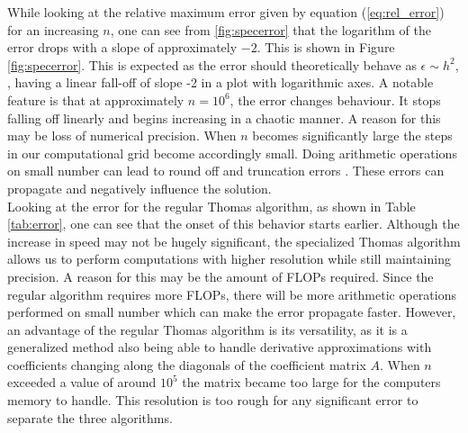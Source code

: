 \documentclass[twocolumn]{aastex62}
\begin{document}
While looking at the relative maximum error given by equation (\ref{eq:rel_error}) for an increasing $n$, one can see from \ref{fig:specerror} that the logarithm of the error drops with a slope of approximately $-2$. This is shown in Figure \ref{fig:specerror}. This is expected as the error should theoretically behave as $\epsilon\sim h^2$, , having a linear fall-off of slope -2 in a plot with logarithmic axes.  A notable feature is that at approximately $n=10^6$, the error changes behaviour. It stops falling off linearly and begins increasing in a chaotic manner. A reason for this may be loss of numerical precision. When $n$ becomes significantly large the steps in our computational grid become accordingly small. Doing arithmetic operations on small number can lead to round off and truncation errors \citep[ch 4.2]{Morken:2017}. These errors can propagate and negatively influence the solution.\\\indent
Looking at the error for the regular Thomas algorithm, as shown in Table \ref{tab:error}, one can see that the onset of this behavior starts earlier. Although the increase in speed may not be hugely significant, the specialized Thomas algorithm allows us to perform computations with higher resolution while still maintaining precision. A reason for this may be the amount of FLOPs required. Since the regular algorithm requires more FLOPs, there will be more arithmetic operations performed on small number which can make the error propagate faster. However, an advantage of the regular Thomas algorithm is its versatility, as it is a generalized method also being able to handle derivative approximations with coefficients changing along the diagonals of the coefficient matrix $A$. When $n$ exceeded a value of around $10^5$ the matrix became too large for the computers memory to handle. This resolution is too rough for any significant error to separate the three algorithms.
\end{document}
